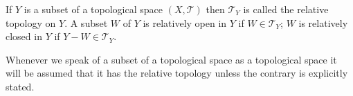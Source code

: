 If $Y$ is a subset of a topological space $(X, \mathcal{T})$ then $\mathcal{T}_Y$ is called the relative topology on $Y$. A subset $W$ of $Y$ is relatively open in $Y$ if $W \in \mathcal{T}_Y$; $W$ is relatively closed in $Y$ if $Y - W \in \mathcal{T}_Y$.

Whenever we speak of a subset of a topological space as a topological space it will be assumed that it has the relative topology unless the contrary is explicitly stated.